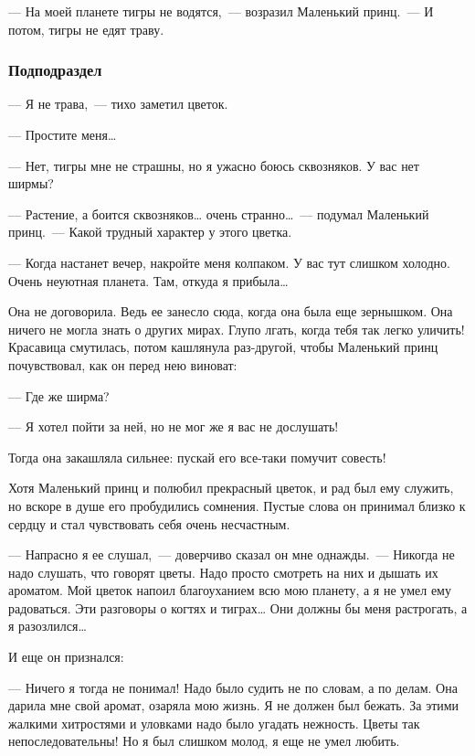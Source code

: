 \documentclass[14pt, a4paper, titlepage]{extarticle}
\begin{document}
--- На моей планете тигры не водятся,~--- возразил Маленький принц.~--- И потом, тигры не едят траву.\cite{bib:prince}

\subsubsection{Подподраздел}

--- Я не трава,~--- тихо заметил цветок.

--- Простите меня\dots{}

--- Нет, тигры мне не страшны, но я ужасно боюсь сквозняков. У вас нет ширмы?

--- Растение, а боится сквозняков\dots{} очень странно\dots{}~--- подумал Маленький принц.~--- Какой трудный характер у этого цветка.

--- Когда настанет вечер, накройте меня колпаком. У вас тут слишком холодно. Очень неуютная планета. Там, откуда я прибыла\dots{}

Она не договорила. Ведь ее занесло сюда, когда она была еще зернышком. Она ничего не могла знать о других мирах. Глупо лгать, когда тебя так легко уличить! Красавица смутилась, потом кашлянула раз-другой, чтобы Маленький принц почувствовал, как он перед нею виноват:

--- Где же ширма?

--- Я хотел пойти за ней, но не мог же я вас не дослушать!

Тогда она закашляла сильнее: пускай его все-таки помучит совесть!

Хотя Маленький принц и полюбил прекрасный цветок, и рад был ему служить, но вскоре в душе его пробудились сомнения. Пустые слова он принимал близко к сердцу и стал чувствовать себя очень несчастным.

--- Напрасно я ее слушал,~--- доверчиво сказал он мне однажды.~--- Никогда не надо слушать, что говорят цветы. Надо просто смотреть на них и дышать их ароматом. Мой цветок напоил благоуханием всю мою планету, а я не умел ему радоваться. Эти разговоры о когтях и тиграх\dots{} Они должны бы меня растрогать, а я разозлился\dots{}

И еще он признался:

--- Ничего я тогда не понимал! Надо было судить не по словам, а по делам. Она дарила мне свой аромат, озаряла мою жизнь. Я не должен был бежать. За этими жалкими хитростями и уловками надо было угадать нежность. Цветы так непоследовательны! Но я был слишком молод, я еще не умел любить.\cite{bib:prince}
\end{document}
